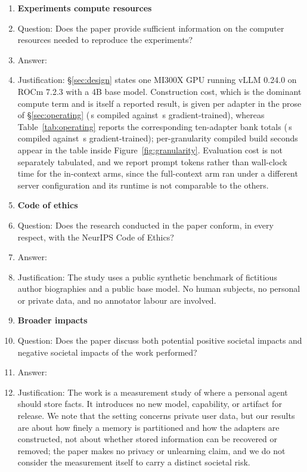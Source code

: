 \begin{enumerate}
\item {\bf Experiments compute resources}
    \item[] Question: Does the paper provide sufficient information on the
    computer resources needed to reproduce the experiments?
    \item[] Answer: \answerYes{}
    \item[] Justification: \S\ref{sec:design} states one MI300X GPU running vLLM
    0.24.0 on ROCm 7.2.3 with a 4B base model. Construction cost, which is the
    dominant compute term and is itself a reported result, is given per adapter
    in the prose of \S\ref{sec:operating} (\DtwoLBuildPer{}\,s compiled against
    \SgdBuildPer{}\,s gradient-trained), whereas Table~\ref{tab:operating}
    reports the corresponding ten-adapter bank totals (\GTwentyBuild{}\,s
    compiled against \SgdBuildTotal{}\,s gradient-trained); per-granularity
    compiled build seconds appear in the table
    inside Figure~\ref{fig:granularity}. Evaluation cost is not separately
    tabulated, and we report prompt tokens rather than wall-clock time for the
    in-context arms, since the full-context arm ran under a different server
    configuration and its runtime is not comparable to the others.

\item {\bf Code of ethics}
    \item[] Question: Does the research conducted in the paper conform, in every
    respect, with the NeurIPS Code of Ethics?
    \item[] Answer: \answerYes{}
    \item[] Justification: The study uses a public synthetic benchmark of
    fictitious author biographies and a public base model. No human subjects, no
    personal or private data, and no annotator labour are involved.

\item {\bf Broader impacts}
    \item[] Question: Does the paper discuss both potential positive societal
    impacts and negative societal impacts of the work performed?
    \item[] Answer: \answerNA{}
    \item[] Justification: The work is a measurement study of where a personal
    agent should store facts. It introduces no new model, capability, or
    artifact for release. We note that the setting concerns private user data,
    but our results are about how finely a memory is partitioned and how the
    adapters are constructed, not about whether stored information can be
    recovered or removed; the paper makes no privacy or unlearning claim, and we
    do not consider the measurement itself to carry a distinct societal risk.


\end{enumerate}
